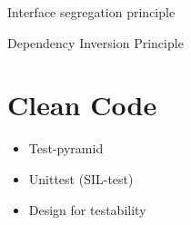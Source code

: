 \documentclass{beamer}
\begin{document}
\begin{frame}{Interface segregation principle}
\end{frame}

\begin{frame}{Dependency Inversion Principle}
\end{frame}

\section{Clean Code}







\begin{frame}
\begin{itemize}
  \item Test-pyramid
  \item Unittest (SIL-test)
  \item Design for testability
\end{itemize}

\end{frame}
\end{document}
